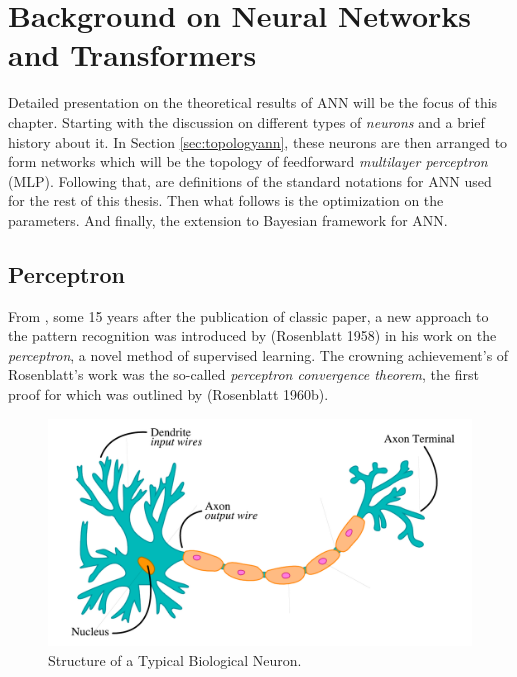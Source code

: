 \chapter{Background on Neural Networks and Transformers}\label{ch:neural-networks}
Detailed presentation on the theoretical results of ANN will be the focus of this chapter. Starting with the discussion on different types of \textit{neurons} and a brief history about it. In Section \ref{sec:topologyann}, these neurons are then arranged to form networks which will be the topology of feedforward \textit{multilayer perceptron} (MLP). Following that, are definitions of the standard notations for ANN used for the rest of this thesis. Then what follows is the optimization on the parameters. And finally, the extension to Bayesian framework for ANN.
\section{Perceptron}
From , some 15 years after the publication of  classic paper, a new approach to the pattern recognition was introduced by (Rosenblatt 1958) in his work on the \textit{perceptron}, a novel method of supervised learning. The crowning achievement's of Rosenblatt's work was the so-called \textit{perceptron convergence theorem}, the first proof for which was outlined by (Rosenblatt 1960b).

\begin{figure}[!h]
\centering\includegraphics[scale = .4]{img/Neuron.pdf}
\caption[Structure of a Typical Biological Neuron]{Structure of a Typical Biological Neuron.\protect\footnotemark}
\label{fig:neuron}
\end{figure}



